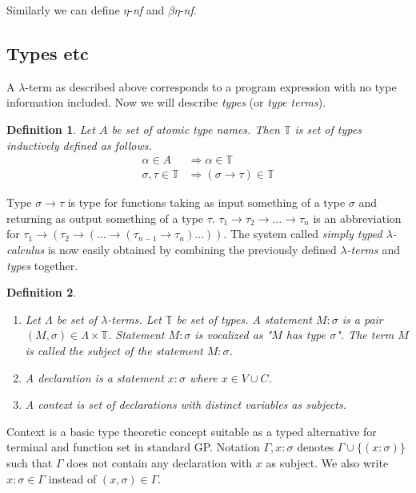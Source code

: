 \documentclass{sig-alternate}
\newtheorem{definition}{Definition}
\newcommand{\lterm}{$\lambda$-term\xspace}
\newcommand{\lterms}{$\lambda$-terms\xspace}
\newcommand{\then}{\Rightarrow\xspace}
\newcommand{\enf}{$\eta$-\textit{nf}\xspace}
\newcommand{\benf}{$\beta\eta$-\textit{nf}\xspace}
\newcommand{\ar}{\rightarrow\xspace}
\newcommand{\T}{\mathbb{T}\xspace}
\begin{document}
Similarly we can define \enf and \benf.



\subsection{Types etc}

A \lterm as described above
corresponds to a program expression with no type information
included. Now we will describe \textit{types} (or \textit{type terms}).

\begin{definition}
Let $A$ be set of {\it atomic type names}. 
Then $\mathbb{T}$ is set of {\it types} inductively defined as follows.
\begin{align*}
\alpha      \in A  &\then   \alpha \in \T \\
\sigma,\tau \in \T &\then ( \sigma \ar  \tau ) \in \T 
\end{align*}
\end{definition}


Type $\sigma \ar \tau$ is type for functions taking as input
something of a type $\sigma$ and returning 
as output something of a type $\tau$. 
$\tau_1 \ar \tau_2 \ar \dots \ar \tau_n$ is an abbreviation for 
$\tau_1 \ar (\tau_2 \ar (\dots \ar (\tau_{n-1} \ar \tau_n)\dots))$.
The system called \textit{simply typed $\lambda$-calculus} is now easily obtained by
combining the previously defined \textit{\lterms} and \textit{types} together.

\begin{definition}~

\begin{enumerate}
 \item 	Let $\Lambda$ be set of {\it \lterms}. 
	Let $\mathbb{T}$ be set of {\it types}.       
	A {\it statement} $M : \sigma$ is a pair 
	$(M,\sigma) \in \Lambda \times \mathbb{T}$.
	Statement $M : \sigma$ is vocalized as 
	{\it "$M$ has type $\sigma$"}.
	The term $M$ is called the {\it subject} of the 
	statement $M : \sigma$.
 \item A \textit{declaration} is a statement 
 $x : \sigma$ where $x \in V \cup C$.
  
 \item A \textit{context} 
 is set of declarations with distinct variables as subjects.
\end{enumerate}
\end{definition}

Context is a basic type theoretic concept suitable as a typed alternative
for terminal and function set in standard GP. 
Notation $\Gamma,x:\sigma $ denotes $ \Gamma\cup\{(x:\sigma)\}$ 
such that $\Gamma$ does not contain any declaration with $x$ as subject.
We also write $x:\sigma \in \Gamma$ instead of $(x,\sigma) \in \Gamma$.
\end{document}
